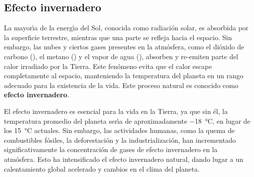 \subsection{Efecto invernadero}\label{cinver}
La mayor\'{\i}a de la energ\'{\i}a del Sol, conocida como radiaci\'on solar, es absorbida por la superficie terrestre, mientras que una parte se refleja hacia el espacio. Sin embargo, las nubes y ciertos gases presentes en la atm\'osfera, como el di\'oxido de carbono (), el metano () y el vapor de agua (), absorben y re-emiten parte del calor irradiado por la Tierra. Este fen\'omeno evita que el calor escape completamente al espacio, manteniendo la temperatura del planeta en un rango adecuado para la existencia de la vida. Este proceso natural es conocido como \textbf{efecto invernadero}.

El efecto invernadero es esencial para la vida en la Tierra, ya que sin \'el, la temperatura promedio del planeta ser\'{\i}a de aproximadamente \SI{-18}{\celsius}, en lugar de los \SI{15}{\celsius} actuales. Sin embargo, las actividades humanas, como la quema de combustibles f\'osiles, la deforestaci\'on y la industrializaci\'on, han incrementado significativamente la concentraci\'on de gases de efecto invernadero en la atm\'osfera. Esto ha intensificado el efecto invernadero natural, dando lugar a un calentamiento global acelerado y cambios en el clima del planeta. 

